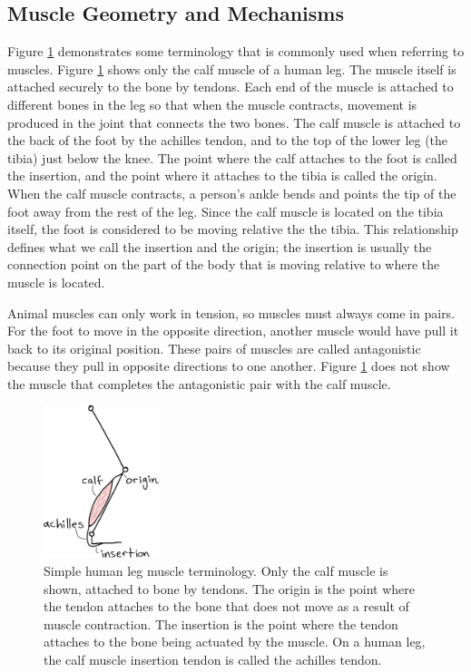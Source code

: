 \subsection{Muscle Geometry and Mechanisms}

Figure \ref{fig:HumanLeg} demonstrates some terminology that is commonly used when referring to muscles. Figure \ref{fig:HumanLeg} shows only the calf muscle of a human leg. The muscle itself is attached securely to the bone by tendons. Each end of the muscle is attached to different bones in the leg so that when the muscle contracts, movement is produced in the joint that connects the two bones. The calf muscle is attached to the back of the foot by the achilles tendon, and to the top of the lower leg (the tibia) just below the knee. The point where the calf attaches to the foot is called the insertion, and the point where it attaches to the tibia is called the origin. When the calf muscle contracts, a person's ankle bends and points the tip of the foot away from the rest of the leg. Since the calf muscle is located on the tibia itself, the foot is considered to be moving relative the the tibia. This relationship defines what we call the insertion and the origin; the insertion is usually the connection point on the part of the body that is moving relative to where the muscle is located. 

Animal muscles can only work in tension, so muscles must always come in pairs. For the foot to move in the opposite direction, another muscle would have pull it back to its original position. These pairs of muscles are called antagonistic because they pull in opposite directions to one another.  Figure \ref{fig:HumanLeg} does not show the muscle that completes the antagonistic pair with the calf muscle. 

\begin{figure}[htb]		%
\begin{centering}
\includegraphics[width=0.3\textwidth]{Figures/HumanLeg}\par
\end{centering}
\caption[Diagram: Simple Human Leg Muscle Terminology]{Simple human leg muscle terminology. Only the calf muscle is shown, attached to bone by tendons. The origin is the point where the tendon attaches to the bone that does not move as a result of muscle contraction. The insertion is the point where the tendon attaches to the bone being actuated by the muscle. On a human leg, the calf muscle insertion tendon is called the achilles tendon.}
\label{fig:HumanLeg}
\end{figure}
%

